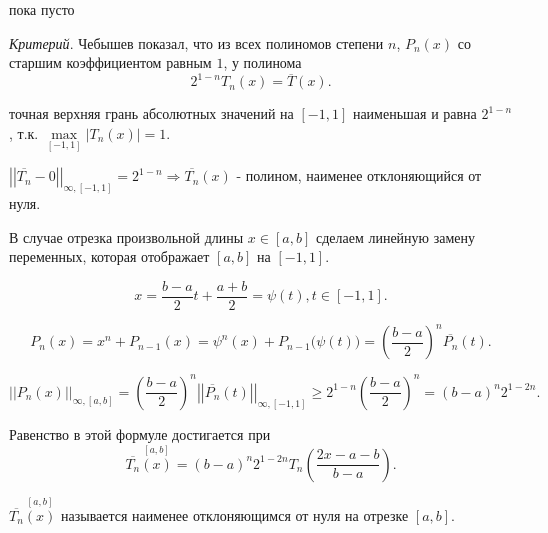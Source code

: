 \begin{col-answer-preambule}
	\begin{plan}
    \item пока пусто
	\end{plan}
\end{col-answer-preambule}


\textit{Критерий}.\newline
Чебышев показал, что из всех полиномов степени $n$, $P_n(x)$ со старшим коэффициентом равным $1$, у полинома
\begin{equation*}
  2^{1-n} T_n(x) = \overline{T}(x).
\end{equation*}

точная верхняя грань абсолютных значений на $[-1, 1]$ наименьшая и равна $2^{1-n}$, т.к. $\max\limits_{[-1, 1]} |T_n(x)| = 1$.

$\left|\left| \overline{T_n} - 0 \right| \right|_{\infty, [-1, 1]} = 2^{1-n} \Rightarrow \overline{T_n} (x)$ - полином, наименее отклоняющийся от нуля.

В случае отрезка произвольной длины $x \in [a, b]$ сделаем линейную замену переменных, которая отображает $[a, b]$ на $[-1, 1]$.

\begin{equation}\label{eq:8_2}
  x = \dfrac{b-a}{2} t + \dfrac{a+b}{2} = \psi(t), t \in [-1, 1].
\end{equation}

\begin{equation*}
  P_n(x) = x^n + P_{n-1}(x) = \psi^n (x) + P_{n-1} \Big( \psi(t) \Big) = \left(\dfrac{b-a}{2}\right)^n \overline{P_n}(t).
\end{equation*}

\begin{equation*}
  \left|\left| P_n(x) \right| \right|_{\infty, [a, b]} = \left(\dfrac{b-a}{2}\right)^n \left|\left| \overline{P_n}(t) \right| \right|_{\infty, [-1, 1]} \geqslant 2^{1-n} \left( \dfrac{b-a}{2} \right)^n = (b-a)^n 2^{1-2n}.
\end{equation*}

Равенство в этой формуле достигается при
\begin{equation*}
  \overline{T_n}\overset{[a, b]}{(x)} = (b - a)^n 2^{1-2n} T_n \left( \dfrac{2x - a - b}{b - a} \right).
\end{equation*}

$\overline{T_n}\overset{[a, b]}{(x)}$ называется наименее отклоняющимся от нуля на отрезке $[a, b]$.

